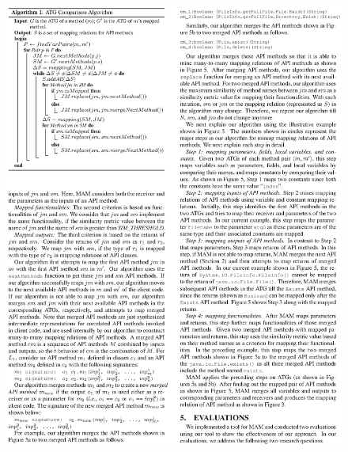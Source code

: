 
\begin{figure}[t]
\centering
\includegraphics[scale=1,clip]{figure/algorithm2.eps}
\vspace*{-6ex}
\end{figure}

